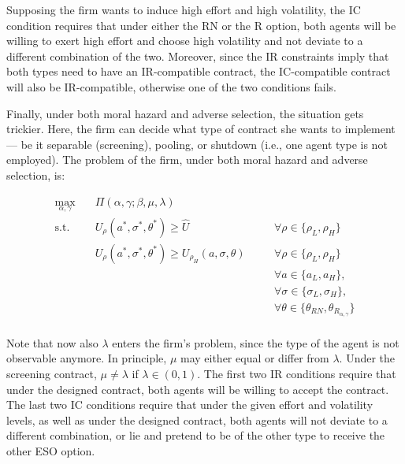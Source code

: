Supposing the firm wants to induce high effort and high volatility, the IC condition requires that under either the RN or the R option, both agents will be willing to exert high effort and choose high volatility and not deviate to a different combination of the two. Moreover, since the IR constraints imply that both types need to have an IR-compatible contract, the IC-compatible contract will also be IR-compatible, otherwise one of the two conditions fails.


Finally, under both moral hazard and adverse selection, the situation gets trickier. Here, the firm can decide what type of contract she wants to implement --- be it separable (screening), pooling, or shutdown (i.e., one agent type is not employed). The problem of the firm, under both moral hazard and adverse selection, is:

\begin{equation}
    \label{eqn:pbl_bestIII_screening}
    \begin{alignedat}{2}
        \max_{\alpha, \gamma} \quad & \Pi (\alpha, \gamma; \beta, \mu, \lambda) \\
        \textrm{s.t.}       \quad & U_{\rho}(a^*, \sigma^*, \theta^*) \ge \hat{U} & \quad & \forall \rho \in \{ \rho_L, \rho_H \}\\
                            \quad & U_{\rho}(a^*, \sigma^*, \theta^*) \ge U_{\rho_H}(a, \sigma, \theta) &\quad& \forall \rho \in \{ \rho_L, \rho_H \}\\
                            \quad & &\quad& \forall a \in \{ a_L, a_H \}, \\
                            \quad & &\quad& \forall \sigma \in \{ \sigma_L, \sigma_H \}, \\
                            \quad & &\quad& \forall \theta \in \{ \theta_{RN}, \theta_{R_{\alpha, \gamma}} \} \\ 
    \end{alignedat}
\end{equation}
\vspace*{4pt}



Note that now also $\lambda$ enters the firm's problem, since the type of the agent is not observable anymore. In principle, $\mu$ may either equal or differ from $\lambda$. Under the screening contract, $\mu \neq \lambda$ if $\lambda \in (0,1)$.
The first two IR conditions require that under the designed contract, both agents will be willing to accept the contract. The last two IC conditions require that under the given effort and volatility levels, as well as under the designed contract, both agents will not deviate to a different combination, or lie and pretend to be of the other type to receive the other ESO option.

